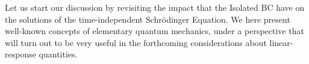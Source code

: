 \documentclass[reprint,aps,prb]{revtex4-1}
\begin{document}
% 



Let us start our discussion by revisiting the impact that the Isolated BC have on the 
solutions of the time-independent Schr\"odinger Equation.
We here present well-known concepts of elementary quantum mechanics, under a perspective that
will turn out to be very useful in the forthcoming considerations about linear-response quantities.
\end{document}

